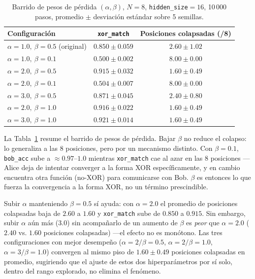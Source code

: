 \documentclass[manuscript,screen]{acmart}
\begin{document}
\begin{table}[h]
  \caption{Barrido de pesos de pérdida $(\alpha,\beta)$, $N=8$, \texttt{hidden\_size}$=16$,
    10\,000 pasos, promedio $\pm$ desviación estándar sobre 5 semillas.}
  \label{tab:alphabeta}
  \begin{tabular}{lcc}
    \toprule
    Configuración & \texttt{xor\_match} & Posiciones colapsadas (/8) \\
    \midrule
    $\alpha{=}1.0,\ \beta{=}0.5$ (original) & $0.850 \pm 0.059$ & $2.60 \pm 1.02$ \\
    $\alpha{=}1.0,\ \beta{=}0.1$            & $0.500 \pm 0.002$ & $8.00 \pm 0.00$ \\
    $\alpha{=}2.0,\ \beta{=}0.5$            & $0.915 \pm 0.032$ & $1.60 \pm 0.49$ \\
    $\alpha{=}2.0,\ \beta{=}0.1$            & $0.504 \pm 0.007$ & $8.00 \pm 0.00$ \\
    $\alpha{=}3.0,\ \beta{=}0.5$            & $0.871 \pm 0.045$ & $2.40 \pm 0.80$ \\
    $\alpha{=}2.0,\ \beta{=}1.0$            & $0.916 \pm 0.022$ & $1.60 \pm 0.49$ \\
    $\alpha{=}3.0,\ \beta{=}1.0$            & $0.921 \pm 0.014$ & $1.60 \pm 0.49$ \\
    \bottomrule
  \end{tabular}
\end{table}

La Tabla~\ref{tab:alphabeta} resume el barrido de pesos de pérdida. Bajar $\beta$ no reduce el
colapso: lo generaliza a las 8 posiciones, pero por un mecanismo distinto. Con
$\beta=0.1$, \texttt{bob\_acc} sube a $\approx 0.97$--$1.0$ mientras \texttt{xor\_match} cae al
azar en las 8 posiciones —Alice deja de intentar converger a la forma XOR específicamente, y en
cambio encuentra otra función (no-XOR) para comunicarse con Bob. $\beta$ es entonces lo que
fuerza la convergencia a la forma XOR, no un término prescindible.

Subir $\alpha$ manteniendo $\beta=0.5$ sí ayuda: con $\alpha=2.0$ el promedio de posiciones
colapsadas baja de $2.60$ a $1.60$ y \texttt{xor\_match} sube de $0.850$ a $0.915$. Sin embargo,
subir $\alpha$ aún más ($3.0$) sin acompañarlo de un aumento de $\beta$ es \emph{peor} que
$\alpha=2.0$ ($2.40$ vs. $1.60$ posiciones colapsadas) —el efecto no es monótono. Las tres
configuraciones con mejor desempeño ($\alpha{=}2/\beta{=}0.5$, $\alpha{=}2/\beta{=}1.0$,
$\alpha{=}3/\beta{=}1.0$) convergen al mismo piso de $1.60 \pm 0.49$ posiciones colapsadas en
promedio, sugiriendo que el ajuste de estos dos hiperparámetros por sí solo, dentro del rango
explorado, no elimina el fenómeno.
\end{document}
